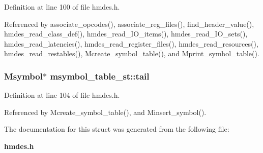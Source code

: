 Definition at line 100 of file hmdes.h.

Referenced by associate\_\-opcodes(), associate\_\-reg\_\-files(), find\_\-header\_\-value(), hmdes\_\-read\_\-class\_\-def(), hmdes\_\-read\_\-IO\_\-items(), hmdes\_\-read\_\-IO\_\-sets(), hmdes\_\-read\_\-latencies(), hmdes\_\-read\_\-register\_\-files(), hmdes\_\-read\_\-resources(), hmdes\_\-read\_\-restables(), Mcreate\_\-symbol\_\-table(), and Mprint\_\-symbol\_\-table().
\subsubsection{\setlength{\rightskip}{0pt plus 5cm}\bf{Msymbol}$\ast$ \bf{msymbol\_\-table\_\-st::tail}}\label{structmsymbol__table__st_7a405eb2135ac076c2f2ba3d565b9a17}




Definition at line 104 of file hmdes.h.

Referenced by Mcreate\_\-symbol\_\-table(), and Minsert\_\-symbol().

The documentation for this struct was generated from the following file:\begin{CompactItemize}
\item 
\bf{hmdes.h}\end{CompactItemize}
